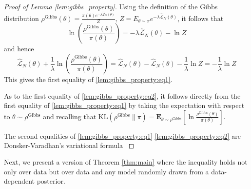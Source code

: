 \documentclass{article}
\newcommand{\KL}{\mathrm{KL}}
\renewcommand{\KL}{\mathrm{KL}}
\newcommand{\bE}{\mathbf{E}}
\begin{document}
 \begin{proof}[Proof of Lemma \ref{lem:gibbs_property}]
  Using the definition of the Gibbs distribution $\rho^{\text{Gibbs}}(\theta)=\frac{\pi(\theta)e^{-\lambda \hat{\mathcal{L}}_N(\theta)}}{Z}$, $Z=E_{\theta \sim \pi} e^{-\lambda \hat{\mathcal{L}}_N(\theta)}$, it follows that
  \[ \ln\left(\frac{\rho^{\text{Gibbs}}(\theta)}{\pi(\theta)}\right) = -\lambda \hat{\mathcal{L}}_N(\theta) - \ln Z \]
  and hence 
  \[ \hat{\mathcal{L}}_N(\theta)+\frac{1}{\lambda}\ln\left(\frac{\rho^{\text{Gibbs}}(\theta)}{\pi(\theta)}\right) = \hat{\mathcal{L}}_N(\theta) - \hat{\mathcal{L}}_N(\theta) - \frac{1}{\lambda} \ln Z = - \frac{1}{\lambda} \ln Z \]
This gives the first equality of \eqref{lem:gibbs_property:eq1}.

As to  the first equality of \eqref{lem:gibbs_property:eq2}, it follows directly from the first equality of  \eqref{lem:gibbs_property:eq1} by taking the expectation with respect to $\theta \sim \rho^{\text{Gibbs}}$ and recalling that $\KL(\rho^{\text{Gibbs}}\|\pi) = \bE_{\theta \sim \rho^{\text{Gibbs}}} \left[\ln \frac{\rho^{\text{Gibbs}}(\theta)}{\pi(\theta)}\right]$.

The second equalities of \eqref{lem:gibbs_property:eq1}-\eqref{lem:gibbs_property:eq2} are 
Donsker-Varadhan's variational formula \cite[Lemma 2.2]{alquier2021userfriendly}

 \end{proof}
 Next, we present a version of Theorem \ref{thm:main} where the inequality
holds not only  over data but over data and 
 any model randomly drawn from a data-dependent posterior.
\end{document}
